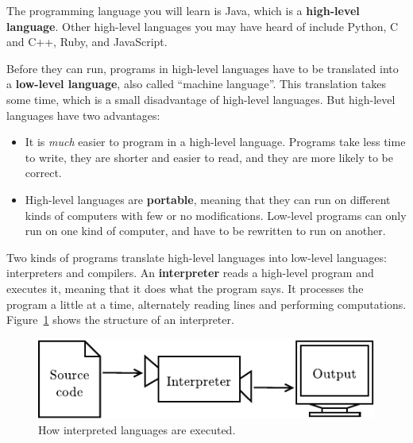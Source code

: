 \documentclass[12pt]{book}
\theoremstyle{exercise}
\begin{document}

The programming language you will learn is Java, which is a {\bf high-level language}.
Other high-level languages you may have heard of include Python, C and C++, Ruby, and JavaScript.


Before they can run, programs in high-level languages have to be translated into a {\bf low-level language}, also called ``machine language''.
This translation takes some time, which is a small disadvantage of high-level languages.
But high-level languages have two advantages:

\begin{itemize}

\item It is {\em much} easier to program in a high-level language.
Programs take less time to write, they are shorter and easier to read, and they are more likely to be correct.


\item High-level languages are {\bf portable}, meaning that they can run on different kinds of computers with few or no modifications.
Low-level programs can only run on one kind of computer, and have to be rewritten to run on another.

\end{itemize}


Two kinds of programs translate high-level languages into low-level languages: interpreters and compilers.
An {\bf interpreter} reads a high-level program and executes it, meaning that it does what the program says.
It processes the program a little at a time, alternately reading lines and performing computations.
Figure~\ref{fig.interp} shows the structure of an interpreter.

\begin{figure}[!ht]
\begin{center}
\includegraphics{figs/interpreter.pdf}
\caption{How interpreted languages are executed.}
\label{fig.interp}
\end{center}
\end{figure}
\end{document}

